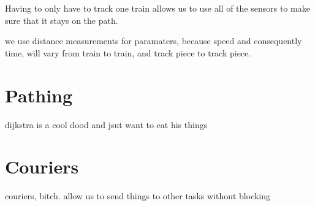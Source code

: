 \documentclass[pdftex,10pt,a4paper]{article}
\begin{document}
Having to only have to track one train allows us to use all of the sensors to
make sure that it stays on the path.

we use distance measurements for paramaters, because speed and
consequently time, will vary from train to train, and track piece to
track piece.

\section*{Pathing}

dijkstra is a cool dood and jsut want to eat his things

\section*{Couriers}

couriers, bitch. allow us to send things to other tasks without
blocking
\end{document}
